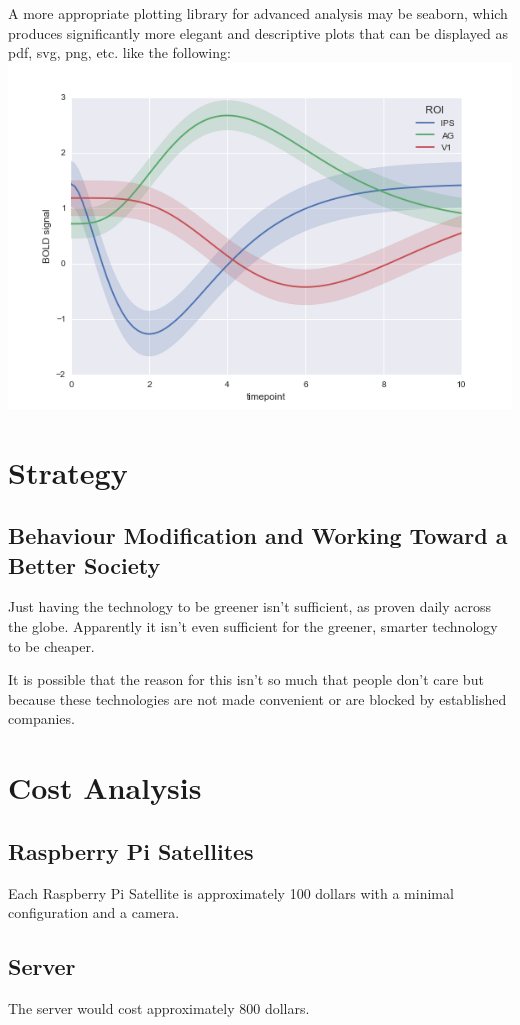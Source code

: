 		A more appropriate plotting library for advanced analysis may be seaborn, which produces significantly more elegant and descriptive plots that can be displayed as pdf, svg, png, etc. like the following:
		\includegraphics[width=.5\textwidth]{gfx/seaborn.png}
			
\section{Strategy}

	\subsection{Behaviour Modification and Working Toward a Better Society}
			
		Just having the technology to be greener isn't sufficient, as proven daily across the globe.
		Apparently it isn't even sufficient for the greener, smarter technology to be cheaper.
		
		It is possible that the reason for this isn't so much that people don't care but because these technologies are not made convenient or are blocked by established companies.
		
			
\section{Cost Analysis}

	\subsection{Raspberry Pi Satellites}
	
		Each Raspberry Pi Satellite is approximately 100 dollars with a minimal configuration and a camera.
	
	\subsection{Server}
	
		The server would cost approximately 800 dollars.
	
